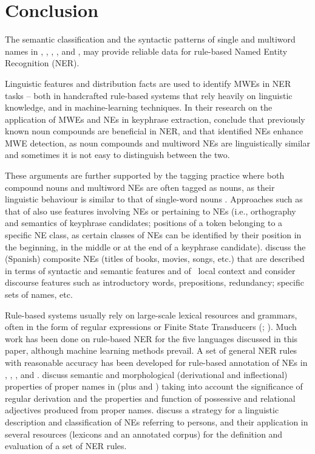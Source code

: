 \documentclass[output=paper]{langsci/langscibook}
\begin{document}
\section{Conclusion}

The semantic classification and the syntactic patterns of single and
multiword names in , , , , and , may
provide reliable data for rule-based Named Entity Recognition (NER).



Linguistic features and distribution facts are used to identify MWEs in
NER tasks – both in handcrafted rule-based systems that rely heavily on
linguistic knowledge, and in machine-learning techniques. In their
research on the application of MWEs and NEs in keyphrase extraction,
\cite{nagy2011} conclude that previously known noun compounds are
beneficial in NER, and that identified NEs enhance MWE detection, as
noun compounds and multiword NEs are linguistically similar and
sometimes it is not easy to distinguish between the two.



These arguments are further supported by the tagging practice where both
compound nouns and multiword NEs are often tagged as nouns, as their
linguistic behaviour is similar to that of single-word nouns \citep{vincze2011}. Approaches such as that of \cite{nagy2011} also use
features involving NEs or pertaining to NEs (i.e., orthography and
semantics of keyphrase candidates; positions of a token belonging to a
specific NE class, as certain classes of NEs can be identified by their
position in the beginning, in the middle or at the end of a keyphrase
candidate). \cite{galicia2004} discuss the (Spanish) composite
NEs (titles of books, movies, songs, etc.) that are described in terms
of syntactic and semantic features and of \ local context and consider
discourse features such as introductory words, prepositions,
redundancy; specific sets of names, etc.



Rule-based systems usually rely on large-scale lexical resources and
grammars, often in the form of regular expressions or Finite State
Transducers (\citealt{savary2011}; \citealt{maurel2011}). Much work
has been done on rule-based NER for the five languages discussed in
this paper, although machine learning methods prevail. A set of general
NER rules with reasonable accuracy has been developed for rule-based
annotation of NEs in  \citep{karagiozov2012},  \citep{maurel2011},  \citep{farmakiotou2000},  and  \citep{krstev2013}. \citet{krstev2007} discuss semantic and morphological
(derivational and inflectional) properties of proper names in 
(plus  and ) taking into account the significance of
regular derivation and the properties and function of possessive and
relational adjectives produced from proper names. \cite{koeva2015} discuss a strategy for a linguistic description and
classification of  NEs referring to persons, and their
application in several resources (lexicons and an annotated corpus) for
the definition and evaluation of a set of NER rules.
\end{document}
